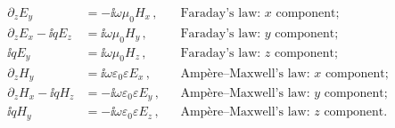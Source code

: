 \begin{subequations} %
    \begin{align}
        \partial_z E_y &=-\ii \omega \mu_0 H_x\,, &  &\text{Faraday's law: $x$ component;}  \label{subeq:Faraday_law_x} \\
        \partial_z E_x-\ii q E_z &=\ii \omega \mu_0 H_y\,, & &\text{Faraday's law: $y$ component;}\ \label{subeq:Faraday_law_y}\\
        \ii q E_y &=\ii \omega \mu_0 H_z\,, & &\text{Faraday's law: $z$ component;} \label{subeq:Faraday_law_z}\\
        \partial_z H_y &=\ii \omega \varepsilon_0 \varepsilon E_x\,, & &\text{Amp\`ere--Maxwell's law: $x$ component;} \label{subeq:Ampere_law_x}\\
        \partial_z H_x-\ii q H_z &=-\ii \omega \varepsilon_0 \varepsilon E_y\,, & &\text{Amp\`ere--Maxwell's law: $y$ component;} \label{subeq:Ampere_law_y}\\
        \ii q H_y &=-\ii \omega \varepsilon_0 \varepsilon E_z\,, & &\text{Amp\`ere--Maxwell's law: $z$ component.} \label{subeq:Ampere_law_z}
    \end{align}
    \label{eq:Maxwells_equations_components}
\end{subequations}


